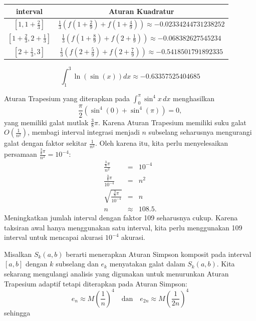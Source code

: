 \begin{description}
\begin{center}
\begin{tabular}{cc}
interval & Aturan Kuadratur\tabularnewline
\hline 
$[1,1+\frac{2}{3}]$ & $\frac{1}{3}\left(f(1+\frac{2}{9})+f(1+\frac{4}{9})\right)\approx-0.02334244731238252$\tabularnewline
$[1+\frac{2}{3},2+\frac{1}{3}]$ & $\frac{1}{3}\left(f(1+\frac{8}{9})+f(2+\frac{1}{9})\right)\approx-0.068382627545234$\tabularnewline
$[2+\frac{1}{3},3]$ & $\frac{1}{3}\left(f(2+\frac{5}{9})+f(2+\frac{7}{9})\right)\approx-0.5418501791892335$\tabularnewline
\end{tabular}
\par\end{center}

\begin{center}
\[
\int_{1}^{3}\ln(\sin(x))dx\approx-0.63357525404685
\]
\par\end{center}
\item [{\ref{exc:calculus-composite-11}:}] Aturan Trapesium yang diterapkan
pada $\int_{0}^{\pi}\sin^{4}x\,dx$ menghasilkan
\[
\frac{\pi}{2}\left(\sin^{4}(0)+\sin^{4}(\pi)\right)=0,
\]
yang memiliki galat mutlak $\frac{3}{8}\pi$. Karena Aturan Trapesium
memiliki suku galat $O\left(\frac{1}{n^{2}}\right)$, membagi interval
integrasi menjadi $n$ subselang seharusnya mengurangi galat dengan
faktor sekitar $\frac{1}{n^{2}}$. Oleh karena itu, kita perlu menyelesaikan
persamaan ${\displaystyle \frac{\frac{3}{8}\pi}{n^{2}}=10^{-4}}$:
\begin{eqnarray*}
\frac{\frac{3}{8}\pi}{n^{2}} & = & 10^{-4}\\
\frac{\frac{3}{8}\pi}{10^{-4}} & = & n^{2}\\
\sqrt{\frac{\frac{3}{8}\pi}{10^{-4}}} & = & n\\
n & \approx & 108.5.
\end{eqnarray*}
Meningkatkan jumlah interval dengan faktor 109 seharusnya cukup. Karena
taksiran awal hanya menggunakan satu interval, kita perlu menggunakan
109 interval untuk mencapai akurasi $10^{-4}$ akurasi.
\item [{\ref{exc:calculus-composite-17}:}] Misalkan $S_{k}(a,b)$ berarti
menerapkan Aturan Simpson komposit pada interval $[a,b]$ dengan $k$
subselang dan $e_{k}$ menyatakan galat dalam $S_{k}(a,b)$. Kita
sekarang mengulangi analisis yang digunakan untuk menurunkan Aturan
Trapesium adaptif tetapi diterapkan pada Aturan Simpson: 
\[
e_{n}\approx M\left(\frac{1}{n}\right)^{4}\quad\mbox{dan}\quad e_{2n}\approx M\left(\frac{1}{2n}\right)^{4}
\]
sehingga

\end{description}
